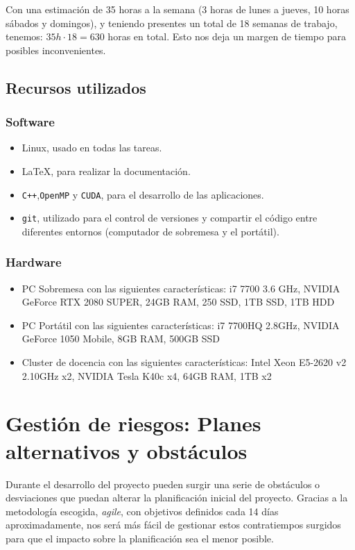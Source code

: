 \documentclass[titlepage,12pt]{report}
\begin{document}
Con una estimación de 35 horas a la semana (3 horas de lunes a jueves, 10 horas sábados y domingos), y teniendo presentes un total de 18 semanas de trabajo, tenemos: $35h \cdot 18 = 630$ horas en total. Esto nos deja un margen de tiempo para posibles inconvenientes.

\subsection{Recursos utilizados}

\subsubsection{Software}

\begin{itemize}
	\item Linux, usado en todas las tareas.
	\item \LaTeX , para realizar la documentación.
	\item \texttt{C++},\texttt{OpenMP} y \texttt{CUDA}, para el desarrollo de las aplicaciones.
	\item \texttt{git}, utilizado para el control de versiones y compartir el código entre diferentes entornos (computador de sobremesa y el portátil).
\end{itemize}

\subsubsection{Hardware}

\begin{itemize}
	\item PC Sobremesa con las siguientes características: i7 7700 3.6 GHz, NVIDIA GeForce RTX 2080 SUPER, 24GB RAM, 250 SSD, 1TB SSD, 1TB HDD
	\item PC Portátil con las siguientes características: i7 7700HQ 2.8GHz, NVIDIA GeForce 1050 Mobile, 8GB RAM, 500GB SSD
	\item Cluster de docencia con las siguientes características: Intel Xeon E5-2620 v2 2.10GHz x2, NVIDIA Tesla K40c x4, 64GB RAM, 1TB x2
\end{itemize}

\section{Gestión de riesgos: Planes alternativos y obstáculos}

Durante el desarrollo del proyecto pueden surgir una serie de obstáculos o desviaciones que puedan alterar la planificación inicial del proyecto. Gracias a la metodología escogida, \textit{agile}, con objetivos definidos cada 14 días aproximadamente, nos será más fácil de gestionar estos contratiempos surgidos para que el impacto sobre la planificación sea el menor posible.
\end{document}
